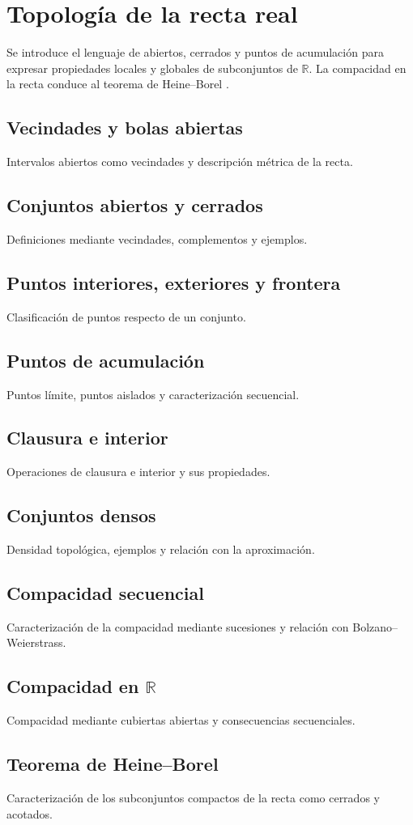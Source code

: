 \chapter{Topología de la recta real}
\label{cap:topologia-recta}

Se introduce el lenguaje de abiertos, cerrados y puntos de acumulación para expresar propiedades locales y globales de subconjuntos de $\mathbb{R}$. La compacidad en la recta conduce al teorema de Heine--Borel \cite{abbott2015,rudin1976}.

\section{Vecindades y bolas abiertas}
Intervalos abiertos como vecindades y descripción métrica de la recta.

\section{Conjuntos abiertos y cerrados}
Definiciones mediante vecindades, complementos y ejemplos.

\section{Puntos interiores, exteriores y frontera}
Clasificación de puntos respecto de un conjunto.

\section{Puntos de acumulación}
Puntos límite, puntos aislados y caracterización secuencial.

\section{Clausura e interior}
Operaciones de clausura e interior y sus propiedades.

\section{Conjuntos densos}
Densidad topológica, ejemplos y relación con la aproximación.

\section{Compacidad secuencial}
Caracterización de la compacidad mediante sucesiones y relación con Bolzano--Weierstrass.

\section{Compacidad en \texorpdfstring{$\mathbb{R}$}{R}}
Compacidad mediante cubiertas abiertas y consecuencias secuenciales.

\section{Teorema de Heine--Borel}
Caracterización de los subconjuntos compactos de la recta como cerrados y acotados.
